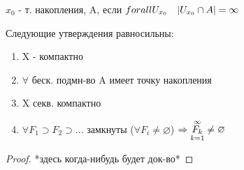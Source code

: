 \documentclass[geometry.tex]{subfiles}
\begin{document}
  \begin{definition}
      $x_0$ - т. накопления, A, если $forall U_{x_0} \quad |U_{x_0} \cap A| = \infty$
  \end{definition}

  \begin{theorem}
      Следующие утверждения равносильны:
      \begin{enumerate}
          \item X - компактно
          \item $\forall$ беск. подмн-во A имеет точку накопления
          \item X секв. компактно
          \item $\forall F_1 \supset F_2 \supset ...$ замкнуты ($\forall F_i \neq \varnothing$) $\Rightarrow \underset{k=1}{\overset{\infty}{F_k}} \neq \varnothing$
      \end{enumerate}
  \end{theorem}

  \begin{proof}
      *здесь когда-нибудь будет док-во*
  \end{proof}
\end{document}
